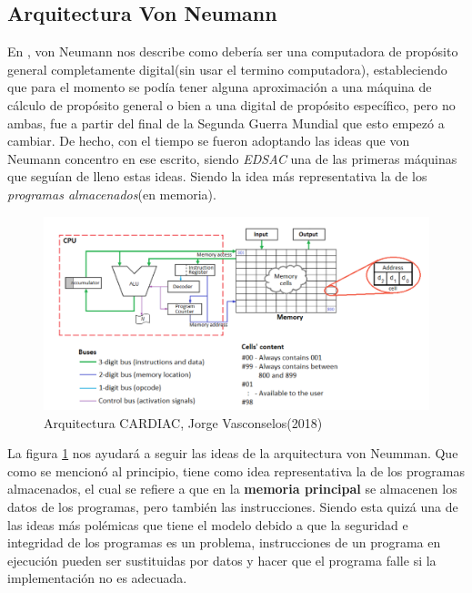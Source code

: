 \documentclass[letterpaper,12pt,oneside]{book}
\begin{document}
		\subsection{Arquitectura Von Neumann}
		
		En \cite{von_neumann_papers_1987}, von Neumann nos describe como debería ser una computadora de propósito general completamente digital(sin usar el 
		termino computadora), estableciendo que para el momento se podía tener alguna aproximación a una máquina de cálculo de propósito general o
		bien a una digital de propósito específico, pero no ambas, fue a partir del final de la Segunda Guerra Mundial que esto empezó a cambiar. De hecho,
		con el tiempo se fueron adoptando las ideas que von Neumann concentro en ese escrito, siendo \textit{EDSAC} una de las primeras máquinas
		que seguían de lleno estas ideas. Siendo la idea más representativa la  de los \textit{programas almacenados}(en memoria).
		
		\begin{figure}[h]
			\includegraphics[scale=0.3]{media/Arquitectura_CARDIAC.png}
			\caption{Arquitectura CARDIAC, Jorge Vasconselos(2018) }%
			\label{fig:Arq_CARDIAC}
		\end{figure}
		
		La figura \ref{fig:Arq_CARDIAC} nos ayudará a seguir las ideas de la arquitectura von Neumman. Que como se mencionó al principio, tiene
		como idea representativa la de los programas almacenados, el cual se refiere a que en la \textbf{memoria principal} se almacenen los datos de
		los programas, pero también las instrucciones. Siendo esta quizá una de las ideas más polémicas que tiene el modelo debido a que la
		seguridad e integridad de los programas es un problema, instrucciones de un programa en ejecución pueden ser sustituidas por datos
		y hacer que el programa falle si la implementación no es adecuada.
  
\end{document}
